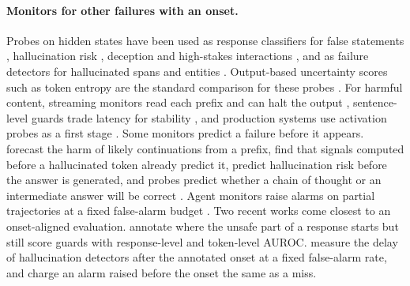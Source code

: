 \paragraph{Monitors for other failures with an onset.}
Probes on hidden states have been used as response classifiers for false
statements \citep{azaria2023internal}, hallucination risk
\citep{kossen2024semantic}, deception \citep{goldowskydill2025deception} and
high-stakes interactions \citep{mckenzie2025highstakes}, and as failure
detectors for hallucinated spans and entities
\citep{chwang2024androids,obeso2025realtime}. Output-based uncertainty scores
such as token entropy are the standard comparison for these probes
\citep{manakul2023selfcheckgpt,obeso2025realtime}. For harmful content,
streaming monitors read each prefix and can halt the output
\citep{sharma2025constitutional,li2025fineharm,qwen2025qwen3guard,li2025kelp},
sentence-level guards trade latency for stability \citep{yu2026sentguard}, and
production systems use activation probes as a first stage
\citep{kramar2026gemini}. Some monitors predict a failure before it appears.
\citet{kavumba2026streamguard} forecast the harm of likely continuations from a
prefix, \citet{snyder2024early} find that signals computed before a
hallucinated token already predict it, \citet{kossen2024semantic} predict
hallucination risk before the answer is generated, and probes predict whether a
chain of thought or an intermediate answer will be correct
\citep{afzal2025knowing,zhang2025reasoning}. Agent monitors raise alarms on
partial trajectories at a fixed false-alarm budget
\citep{huang2026prefixguard,dubey2026realtime}. Two recent works come closest to
an onset-aligned evaluation. \citet{singteam2026singprobe} annotate where the
unsafe part of a response starts but still score guards with response-level and
token-level AUROC. \citet{itkin2026quickest} measure the delay of hallucination
detectors after the annotated onset at a fixed false-alarm rate, and charge an
alarm raised before the onset the same as a miss.


